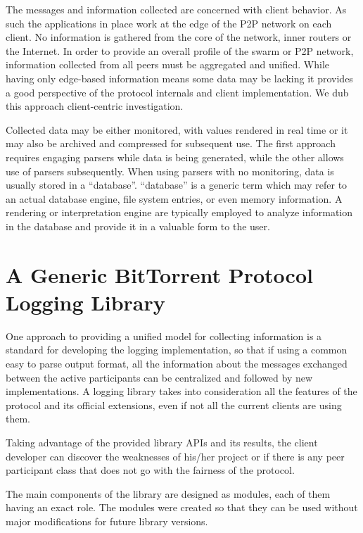 The messages and information collected are concerned with client behavior. As
such the applications in place work at the edge of the P2P network on each
client. No information is gathered from the core of the network, inner routers
or the Internet. In order to provide an overall profile of the swarm or P2P
network, information collected from all peers must be aggregated and unified.
While having only edge-based information means some data may be lacking it
provides a good perspective of the protocol internals and client
implementation. We dub this approach client-centric investigation.

Collected data may be either monitored, with values rendered in real time or
it may also be archived and compressed for subsequent use. The first approach
requires engaging parsers while data is being generated, while the other
allows use of parsers subsequently. When using parsers with no monitoring,
data is usually stored in a ``database''. ``database'' is a generic term which
may refer to an actual database engine, file system entries, or even memory
information. A rendering or interpretation engine are typically employed to
analyze information in the database and provide it in a valuable form to the
user.

\section{A Generic BitTorrent Protocol Logging Library}
\label{sec:proto-measure:log-library}

One approach to providing a unified model for collecting information is a
standard for developing the logging implementation, so that if using a common
easy to parse output format, all the information about the messages exchanged
between the active participants can be centralized and followed by new
implementations. A logging library takes into consideration all the features of
the protocol and its official extensions, even if not all the current clients
are using them.

Taking advantage of the provided library APIs and its results, the client
developer can discover the weaknesses of his/her project or if there is any
peer participant class that does not go with the fairness of the protocol.

The main components of the library are designed as modules, each of them
having an exact role. The modules were created so that they can be used
without major modifications for future library versions.

